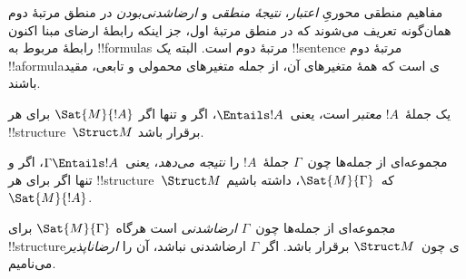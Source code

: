 \documentclass[../../../include/open-logic-section]{subfiles}
\begin{document}

\begin{explain}
مفاهیم منطقی محوریِ \emph{اعتبار}، \emph{نتیجهٔ منطقی} و
\emph{ارضاشدنی‌بودن} در منطق مرتبهٔ دوم همان‌گونه تعریف می‌شوند که در
منطق مرتبهٔ اول، جز اینکه رابطهٔ ارضای مبنا اکنون رابطهٔ مربوط به
!!{formula}s مرتبهٔ دوم است. البته یک !!{sentence} مرتبهٔ دوم
!!a{formula}ی است که همهٔ متغیرهای آن، از جمله متغیرهای محمولی و
تابعی، مقید باشند.
\end{explain}

\begin{defn}[اعتبار]
یک جملهٔ~$!A$ \emph{معتبر} است، یعنی~$\Entails !A$، اگر و تنها اگر
$\Sat{M}{!A}$ برای هر !!{structure}~$\Struct M$ برقرار باشد.
\end{defn}

\begin{defn}
مجموعه‌ای از جمله‌ها چون~$\Gamma$ جملهٔ~$!A$ را \emph{نتیجه می‌دهد}،
یعنی~$\Gamma \Entails !A$، اگر و تنها اگر برای هر
!!{structure}~$\Struct M$ که~$\Sat{M}{\Gamma}$، داشته باشیم
$\Sat{M}{!A}$.
\end{defn}

\begin{defn}
مجموعه‌ای از جمله‌ها چون~$\Gamma$ \emph{ارضاشدنی} است هرگاه
$\Sat{M}{\Gamma}$ برای !!{structure}ی چون~$\Struct M$ برقرار باشد. اگر
$\Gamma$ ارضاشدنی نباشد، آن را \emph{ارضاناپذیر} می‌نامیم.
\end{defn}
\end{document}
